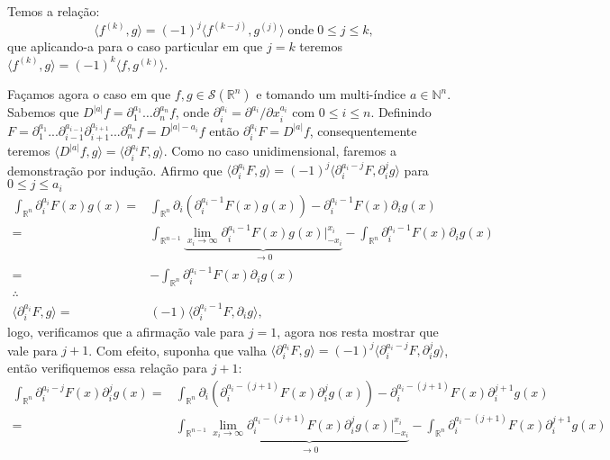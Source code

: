 \documentclass{article}
\begin{document}
\begin{enumerate}
		Temos a relação: 
		$$
		\langle f^{(k)},g \rangle = (-1)^{j}\langle f^{(k-j)},g^{(j)} \rangle \; \text{onde} \; 0 \leq j \leq k,
		$$
		que aplicando-a para o caso particular em que $j = k$ teremos $\langle f^{(k)},g \rangle = (-1)^{k}\langle f,g^{(k)} \rangle$.
		
		Façamos agora o caso em que $f, g \in \mathcal{S}(\mathbb{R}^{n})$ e tomando um multi-índice $a \in \mathbb{N}^{n}$. Sabemos que $D^{|a|}f = \partial^{a_{1}}_{1} \dots \partial^{a_{n}}_{n} f$, onde $\partial^{a_{i}}_{i}  = \partial^{a_{i}}/\partial x^{a_{i}}_{i}$ com $0\leq i \leq n$. Definindo $F = \partial^{a_{1}}_{1}...\partial^{a_{i-1}}_{i-1}\partial^{a_{i+1}}_{i+1}...\partial^{a_{n}}_{n}f = D^{|a|-a_{i}}f$ então $\partial^{a_{i}}_{i}F = D^{|a|}f$, consequentemente teremos $\langle D^{|a|}f, g \rangle =\langle \partial^{a_{i}}_{i}F, g \rangle$. Como no caso unidimensional, faremos a demonstração por indução. Afirmo que $\langle \partial^{a_{i}}_{i}F, g \rangle = (-1)^{j} \langle \partial^{a_{i}-j}_{i}F, \partial^{j}_{i}g \rangle$ para $0 \leq j \leq a_{i}$
		$$
		\begin{aligned}
		\int_{\mathbb{R}^{n}}\partial^{a_{i}}_{i}F(x)g(x) = & \int_{\mathbb{R}^{n}} \partial_{i}(\partial^{a_{i}-1}_{i}F(x)g(x)) -  \partial^{a_{i}-1}_{i}F(x) \partial_{i}g(x)
		\\
		= & \int_{\mathbb{R}^{n-1}} \underbrace{ \lim_{x_{i} \to \infty}\partial^{a_{i}-1}_{i}F(x)g(x) \Big|^{x_{i}}_{-x_{i}} }_{\to 0} -  \int_{\mathbb{R}^{n}} \partial^{a_{i}-1}_{i}F(x) \partial_{i}g(x)
		\\
		= & - \int_{\mathbb{R}^{n}}\partial^{a_{i}-1}_{i}F(x) \partial_{i}g(x)
		\\
		\therefore
		\\
		\langle \partial^{a_{i}}_{i}F, g \rangle = & (-1)\langle \partial^{a_{i}-1}_{i}F, \partial_{i}g \rangle,
		\end{aligned}
		$$
		logo, verificamos que a afirmação vale para $j=1$, agora nos resta mostrar que vale para $j+1$. Com efeito, suponha que valha $\langle \partial^{a_{i}}_{i}F, g \rangle = (-1)^{j} \langle \partial^{a_{i}-j}_{i}F, \partial^{j}_{i}g \rangle$, então verifiquemos essa relação para $j+1$:
		$$
		\begin{aligned}
		\int_{\mathbb{R}^{n}}\partial^{a_{i}-j}_{i}F(x) \partial^{j}_{i}g(x) = & \int_{\mathbb{R}^{n}} \partial_{i}(\partial^{a_{i}-(j+1)}_{i}F(x)\partial^{j}_{i}g(x)) -  \partial^{a_{i}-(j+1)}_{i}F(x) \partial^{j+1}_{i}g(x)
		\\
		= & \int_{\mathbb{R}^{n-1}} \underbrace{ \lim_{x_{i} \to \infty} \partial^{a_{i}-(j+1)}_{i}F(x)\partial^{j}_{i}g(x) \Big|^{x_{i}}_{-x_{i}} }_{\to 0} -  \int_{\mathbb{R}^{n}} \partial^{a_{i}-(j+1)}_{i}F(x) \partial^{j+1}_{i}g(x)

\end{aligned}$$
\end{enumerate}
\end{document}

